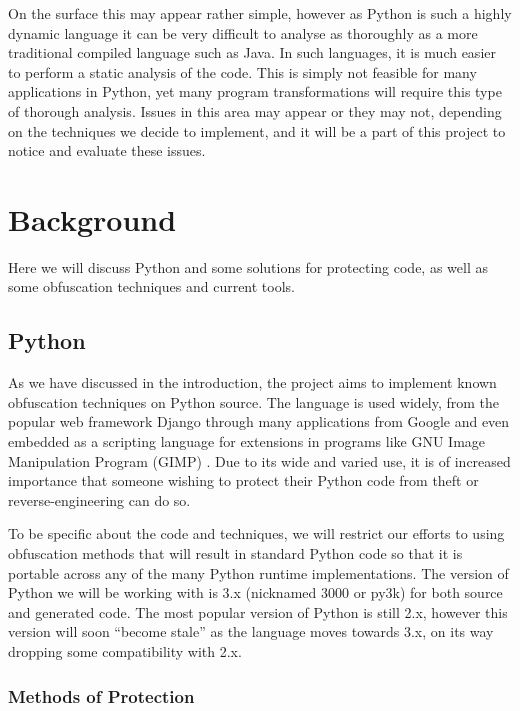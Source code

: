 \documentclass{report}
\begin{document}
On the surface this may appear rather simple, however as Python is such a highly dynamic language it can be very difficult to analyse
\cite[p13]{staticanal} as thoroughly as a more traditional compiled language such as Java. In such languages, it is much easier to perform a static
analysis of the code. This is simply not feasible for many applications in Python, yet many program transformations will require this type of
thorough analysis. Issues in this area may appear or they may not, depending on the techniques we decide to implement, and it will be a part of
this project to notice and evaluate these issues.

\section{Background}

Here we will discuss Python and some solutions for protecting code, as well as some obfuscation techniques
and current tools.

\subsection{Python}

As we have discussed in the introduction, the project aims to implement known obfuscation techniques on Python source.
The language is used widely, from the popular web framework Django \cite{django} through many applications
from Google \cite{pygoogle} and even embedded as a scripting language for extensions in programs like GNU
Image Manipulation Program (GIMP) \cite{gimp}. Due to its wide and varied use, it is of increased importance
that someone wishing to protect their Python code from theft or reverse-engineering can do so.

To be specific about the code and techniques, we will restrict our efforts to using obfuscation methods that will
result in standard Python code so that it is portable across any of the many Python runtime implementations. The version
of Python we will be working with is 3.x (nicknamed 3000 or py3k) for both source and generated code. The most popular
version of Python is still 2.x, however this version will soon ``become stale'' as the language moves towards 3.x, on its way
dropping some compatibility with 2.x.

\subsubsection{Methods of Protection}
\end{document}
